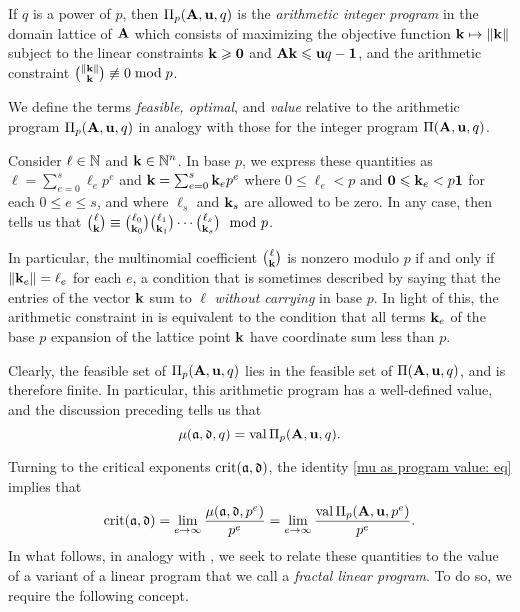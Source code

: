 \documentclass{article}
\begin{document}
\begin{definition}
\label{aip: D}
If $q$ is a power of $p$, then $\Pi_p(\mathbf{A}, \mathbf{u}, q)$ is the \emph{arithmetic integer program} in the domain lattice of $\mathbf{A}$ which consists of maximizing the objective function $\mathbf{k} \mapsto \| \mathbf{k} \|$ subject to the linear constraints $\mathbf{k} \geqslant \mathbf{0}$ and $\mathbf{A} \mathbf{k} \leqslant \mathbf{u}q - \mathbf{1}$, and the arithmetic constraint $\binom{\| \mathbf{k} \|}{\mathbf{k}} \not \equiv 0 \bmod p$.
\end{definition}

We define the terms \emph{feasible, optimal}, and \emph{value} relative to the arithmetic program $\Pi_p(\mathbf{A}, \mathbf{u}, q)$ in analogy with those for the integer program $\Pi(\mathbf{A}, \mathbf{u}, q)$.

\begin{remark}
   \label{dickson: R}
   Consider $\ell \in \mathbb{N}$ and $\mathbf{k} \in \mathbb{N}^n$.
   In base $p$, we express these quantities as $\ell = \sum_{e=0}^s \ell_e p^e$ and $\mathbf{k}=\sum_{e=0}^s \mathbf{k}_e p^e$ where $0\le \ell_e < p$ and $\mathbf{0}\leqslant\mathbf{k}_e < p  \mathbf{1}$ for each $0 \leq e \leq s$, and where $\ell_s$ and $\mathbf{k}_s$ are allowed to be zero.
   In any case, \cite{dickson.multinomial} then tells us that $\binom{\ell}{\mathbf{k}}\equiv \binom{\ell_0}{\mathbf{k}_0}\binom{\ell_1}{\mathbf{k}_1}\cdots \binom{\ell_s}{\mathbf{k}_s} \mod{p}$.

   In particular, the multinomial coefficient $\binom{\ell}{\mathbf{k}}$ is nonzero modulo $p$ if and only if $\| \mathbf{k}_e \|=\ell_e$ for each $e$, a condition that is sometimes described by saying that the entries of the vector $\mathbf{k}$ sum to $\ell$ \emph{without carrying} in base $p$.
   In light of this, the arithmetic constraint in  is equivalent to the condition that all terms $\mathbf{k}_e$ of the base $p$ expansion of the lattice point $\mathbf{k}$ have coordinate sum less than $p$.
\end{remark}

Clearly, the feasible set of $\Pi_p(\mathbf{A}, \mathbf{u}, q)$ lies in the feasible set of $\Pi(\mathbf{A}, \mathbf{u},q)$, and is therefore finite.
In particular, this arithmetic program has a well-defined value, and the discussion preceding  tells us that
\begin{equation}
\label{mu as program value: eq}
\mu(\mathfrak{a},\mathfrak{d},q) = \operatorname{val} \Pi_p(\mathbf{A},\mathbf{u},q).
\end{equation}

Turning to the critical exponents $\operatorname{crit}(\mathfrak{a}, \mathfrak{d})$, the identity \eqref{mu as program value: eq} implies that
\begin{equation}
\label{crit as limit of normalized program values: eq}
\operatorname{crit}(\mathfrak{a},\mathfrak{d}) = \lim_{e\to\infty} \frac{\mu(\mathfrak{a},\mathfrak{d},p^e)}{p^e} = \lim_{e\to\infty} \frac{\operatorname{val} \Pi_p(\mathbf{A},\mathbf{u},p^e)}{p^e}.
\end{equation}
In what follows, in analogy with , we seek to relate these quantities to the value of a variant of a linear program that we call a \emph{fractal linear program}.  To do so, we require the following concept.
\end{document}
